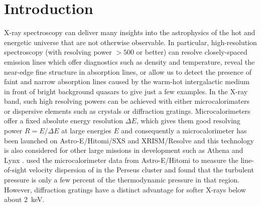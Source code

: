 \documentclass[linenumbers]{aastex631}
\begin{document}

\section{Introduction} \label{sec:intro}
X-ray spectroscopy can deliver many insights into the astrophysics of the hot and energetic universe that are not otherwise observable. In particular, high-resolution spectroscopy (with resolving power $> 500$ or better) can resolve closely-spaced emission lines which offer diagnostics such as density and temperature, reveal the near-edge fine structure in absorption lines, or allow us to detect the presence of faint and narrow absorption lines caused by the warm-hot intergalactic medium in front of bright background quasars to give just a few examples. In the X-ray band, such high resolving powers can be achieved with either microcalorimaters or dispersive elements such as crystals or diffraction gratings. Microcalorimeters offer a fixed absolute energy resolution $\Delta E$, which gives them good resolving power $R=E/\Delta E$ at large energies $E$ and consequently a microcalorimeter has been launched on Astro-E/Hitomi/SXS \citep{2014SPIE.9144E..2AM} and XRISM/Resolve \citep{2018JATIS...4a1214K} and this technology is also considered for other large missions in development such as Athena \citep{2014SPIE.9144E..2LR} and Lynx \citep{2019JATIS...5b1017B}. \citet{2016Natur.535..117H} used the microcalorimeter data from Astro-E/Hitomi to measure the line-of-sight velocity dispersion of  in the Perseus cluster and found that the turbulent pressure is only a few percent of the thermodynamic pressure in that region. However, diffraction gratings have a distinct advantage for softer X-rays below about 2~keV.
\end{document}
